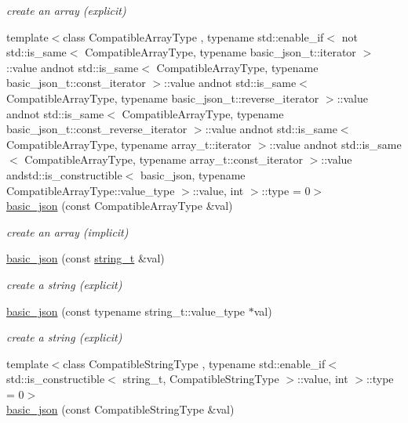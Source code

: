 \begin{DoxyCompactItemize}
\begin{DoxyCompactList}\small\item\em create an array (explicit) \end{DoxyCompactList}\item 
{\footnotesize template$<$class Compatible\-Array\-Type , typename std\-::enable\-\_\-if$<$ not std\-::is\-\_\-same$<$ Compatible\-Array\-Type, typename basic\-\_\-json\-\_\-t\-::iterator $>$\-::value andnot std\-::is\-\_\-same$<$ Compatible\-Array\-Type, typename basic\-\_\-json\-\_\-t\-::const\-\_\-iterator $>$\-::value andnot std\-::is\-\_\-same$<$ Compatible\-Array\-Type, typename basic\-\_\-json\-\_\-t\-::reverse\-\_\-iterator $>$\-::value andnot std\-::is\-\_\-same$<$ Compatible\-Array\-Type, typename basic\-\_\-json\-\_\-t\-::const\-\_\-reverse\-\_\-iterator $>$\-::value andnot std\-::is\-\_\-same$<$ Compatible\-Array\-Type, typename array\-\_\-t\-::iterator $>$\-::value andnot std\-::is\-\_\-same$<$ Compatible\-Array\-Type, typename array\-\_\-t\-::const\-\_\-iterator $>$\-::value andstd\-::is\-\_\-constructible$<$ basic\-\_\-json, typename Compatible\-Array\-Type\-::value\-\_\-type $>$\-::value, int $>$\-::type  = 0$>$ }\\\hyperlink{classnlohmann_1_1basic__json_a81aaaab0f3b326afda2d226daab4f1e1}{basic\-\_\-json} (const Compatible\-Array\-Type \&val)
\begin{DoxyCompactList}\small\item\em create an array (implicit) \end{DoxyCompactList}\item 
\hyperlink{classnlohmann_1_1basic__json_ab8b43d92a042dde96c28aeea81dd52de}{basic\-\_\-json} (const \hyperlink{classnlohmann_1_1basic__json_ab63e618bbb0371042b1bec17f5891f42}{string\-\_\-t} \&val)
\begin{DoxyCompactList}\small\item\em create a string (explicit) \end{DoxyCompactList}\item 
\hyperlink{classnlohmann_1_1basic__json_a3654da9a84deaf61899c4eee5b93c2c5}{basic\-\_\-json} (const typename string\-\_\-t\-::value\-\_\-type $\ast$val)
\begin{DoxyCompactList}\small\item\em create a string (explicit) \end{DoxyCompactList}\item 
{\footnotesize template$<$class Compatible\-String\-Type , typename std\-::enable\-\_\-if$<$ std\-::is\-\_\-constructible$<$ string\-\_\-t, Compatible\-String\-Type $>$\-::value, int $>$\-::type  = 0$>$ }\\\hyperlink{classnlohmann_1_1basic__json_ae85d91b0620650bcd9993e09d0e287d9}{basic\-\_\-json} (const Compatible\-String\-Type \&val)

\end{DoxyCompactItemize}

